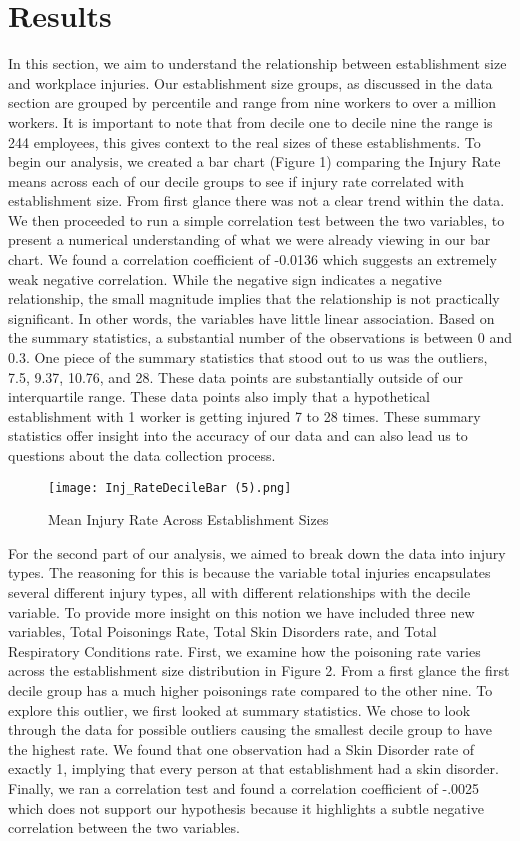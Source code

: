 \documentclass[12pt]{article}
\begin{document}
\section{Results}
\label{sec:result}
In this section, we aim to understand the relationship between establishment size and workplace injuries. Our establishment size groups, as discussed in the data section are grouped by percentile and range from nine workers to over a million workers. It is important to note that from decile one to decile nine the range is 244 employees, this gives context to the real sizes of these establishments. To begin our analysis, we created a bar chart (Figure 1) comparing the Injury Rate means across each of our decile groups to see if injury rate correlated with establishment size. From first glance there was not a clear trend within the data. We then proceeded to run a simple correlation test between the two variables, to present a numerical understanding of what we were already viewing in our bar chart. We found a correlation coefficient of -0.0136 which suggests an extremely weak negative correlation. While the negative sign indicates a negative relationship, the small magnitude implies that the relationship is not practically significant. In other words, the variables have little linear association. Based on the summary statistics, a substantial number of the observations is between 0 and 0.3. One piece of the summary statistics that stood out to us was the outliers, 7.5, 9.37, 10.76, and 28. These data points are substantially outside of our interquartile range. These data points also imply that a hypothetical establishment with 1 worker is getting injured 7 to 28 times. These summary statistics offer insight into the accuracy of our data and can also lead us to questions about the data collection process.

\begin{figure}
    \centering
    \texttt{[image: Inj\_RateDecileBar (5).png]}
    \caption{Mean Injury Rate Across Establishment Sizes}
    \label{fig:enter-label}
\end{figure}
For the second part of our analysis, we aimed to break down the data into injury types. The reasoning for this is because the variable total injuries encapsulates several different injury types, all with different relationships with the decile variable. To provide more insight on this notion we have included three new variables, Total Poisonings Rate, Total Skin Disorders rate, and Total Respiratory Conditions rate. First, we examine how the poisoning rate varies across the establishment size distribution in Figure 2. From a first glance the first decile group has a much higher poisonings rate compared to the other nine. To explore this outlier, we first looked at summary statistics. We chose to look through the data for possible outliers causing the smallest decile group to have the highest rate. We found that one observation had a Skin Disorder rate of exactly 1, implying that every person at that establishment had a skin disorder. Finally, we ran a correlation test and found a correlation coefficient of -.0025 which does not support our hypothesis because it highlights a subtle negative correlation between the two variables.
\end{document}
